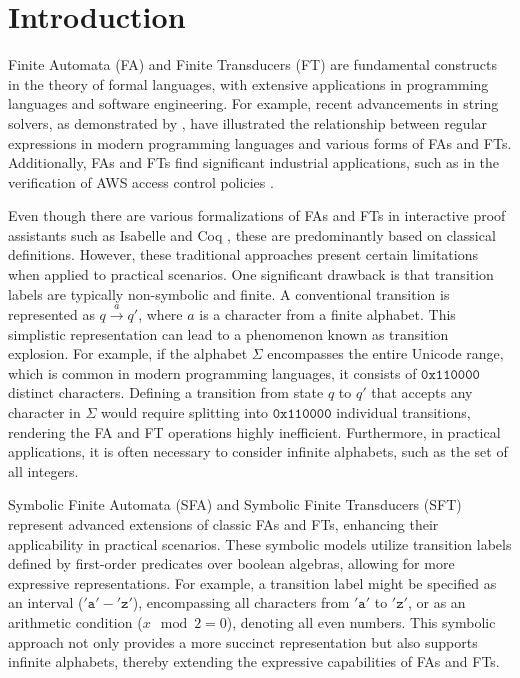 \section{Introduction}
\label{sec:introduction}

Finite Automata (FA) and Finite Transducers (FT) are fundamental constructs in the theory of formal languages, with extensive applications in programming languages and software engineering. For example, recent advancements in string solvers, as demonstrated by \cite{pacmpl/ChenFHHHKLRW22}, have illustrated the relationship between regular expressions in modern programming languages and various forms of FAs and FTs. Additionally, FAs and FTs find significant industrial applications, such as in the verification of AWS access control policies \cite{DBLP:conf/fmcad/BackesBCDGLRTV18}.


Even though there are various formalizations of FAs and FTs in interactive proof assistants such as Isabelle \cite{isabelle-homepage} and Coq \cite{coq-homepage}, these are predominantly based on classical definitions. However, these traditional approaches present certain limitations when applied to practical scenarios. One significant drawback is that transition labels are typically non-symbolic and finite. A conventional transition is represented as $q\xrightarrow{a}q'$, where $a$ is a character from a finite alphabet. This simplistic representation can lead to a phenomenon known as transition explosion. For example, if the alphabet $\Sigma$ encompasses the entire Unicode range, which is common in modern programming languages, it consists of $\texttt{0x110000}$ distinct characters. Defining a transition from state $q$ to $q'$ that accepts any character in $\Sigma$ would require splitting into $\texttt{0x110000}$ individual transitions, rendering the FA and FT operations highly inefficient. Furthermore, in practical applications, it is often necessary to consider infinite alphabets, such as the set of all integers.



Symbolic Finite Automata (SFA) and Symbolic Finite Transducers (SFT) \cite{cav/DAntoniV17, VeanesHLMB12Transducer} represent advanced extensions of classic FAs and  FTs, enhancing their applicability in practical scenarios.
%
These symbolic models utilize transition labels defined by first-order predicates over boolean algebras, allowing for more expressive representations. For example, a transition label might be specified as an interval ($'\texttt{a}'-'\texttt{z}'$), encompassing all characters from $'\texttt{a}'$ to $'\texttt{z}'$, or as an arithmetic condition ($x \mod 2 = 0$), denoting all even numbers. This symbolic approach not only provides a more succinct representation but also supports infinite alphabets, thereby extending the expressive capabilities of FAs and FTs.



